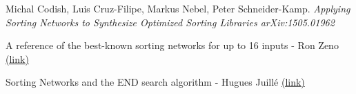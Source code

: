 \begin{thebibliography}{9}
Michal Codish, Luis Cruz-Filipe, Markus Nebel, Peter Schneider-Kamp.
\it{Applying Sorting Networks to Synthesize Optimized Sorting Libraries}
arXiv:1505.01962

A reference of the best-known sorting networks for up to 16
inputs - Ron Zeno
\href{http://www.angelfire.com/blog/ronz/Articles/999SortingNetworksReferen.html}{(link)}

Sorting Networks and the END search algorithm - Hugues Juillé
\href{http://www.cs.brandeis.edu/~hugues/sorting_networks.html}{(link)}
\end{thebibliography}
